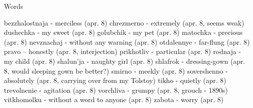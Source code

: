 Words

bezzhalostnaja - merciless (apr. 8)
chrezmerno - extremely (apr. 8, seems weak)
dushechka - my sweet (apr. 8)
golubchik - my pet (apr. 8)
matochka - precious (apr. 8)
nevznachaj - without any warning (apr. 8)
otdalennye - far-flung (apr. 8)
pravo -- honestly (apr. 8, interjection)
prikhotliv - particular (apr. 8)
rodnaja - my child (apr. 8)
shalun'ja - naughty girl (apr. 8)
shlafrok - dressing-gown (apr. 8, would sleeping gown be better?)
smirno - meekly (apr. 8)
sovershenno - absolutely (apr. 8, carrying over from my Tolstoy)
tikho - quietly (apr. 8)
trevolnenie - agitation (apr. 8)
vorchliva - grumpy (apr. 8, grouch - 1890s)
vitkhomolku - without a word to anyone (apr. 8)
zabota - worry (apr. 8)